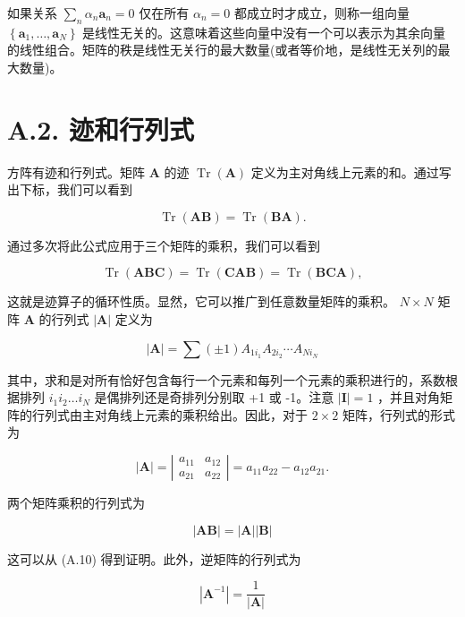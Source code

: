 \documentclass[10pt]{article}
\begin{document}
如果关系 \(\mathop{\sum }\limits_{n}{\alpha }_{n}{\mathbf{a}}_{n} = 0\) 仅在所有 \({\alpha }_{n} = 0\) 都成立时才成立，则称一组向量 \(\left\{  {{\mathbf{a}}_{1},\ldots ,{\mathbf{a}}_{N}}\right\}\) 是线性无关的。这意味着这些向量中没有一个可以表示为其余向量的线性组合。矩阵的秩是线性无关行的最大数量(或者等价地，是线性无关列的最大数量)。

\section*{A.2. 迹和行列式}

方阵有迹和行列式。矩阵 \(\mathbf{A}\) 的迹 \(\operatorname{Tr}\left( \mathbf{A}\right)\) 定义为主对角线上元素的和。通过写出下标，我们可以看到

\[
\operatorname{Tr}\left( \mathbf{{AB}}\right)  = \operatorname{Tr}\left( \mathbf{{BA}}\right) . \tag{A.8}
\]

通过多次将此公式应用于三个矩阵的乘积，我们可以看到

\[
\operatorname{Tr}\left( \mathbf{{ABC}}\right)  = \operatorname{Tr}\left( \mathbf{{CAB}}\right)  = \operatorname{Tr}\left( \mathbf{{BCA}}\right) , \tag{A.9}
\]

这就是迹算子的循环性质。显然，它可以推广到任意数量矩阵的乘积。 \(N \times  N\) 矩阵 \(\mathbf{A}\) 的行列式 \(\left| \mathbf{A}\right|\) 定义为

\[
\left| \mathbf{A}\right|  = \sum \left( {\pm 1}\right) {A}_{1{i}_{1}}{A}_{2{i}_{2}}\cdots {A}_{N{i}_{N}} \tag{A.10}
\]

其中，求和是对所有恰好包含每行一个元素和每列一个元素的乘积进行的，系数根据排列 \({i}_{1}{i}_{2}\ldots {i}_{N}\) 是偶排列还是奇排列分别取 +1 或 -1。注意 \(\left| \mathbf{I}\right|  = 1\) ，并且对角矩阵的行列式由主对角线上元素的乘积给出。因此，对于 \(2 \times  2\) 矩阵，行列式的形式为

\[
\left| \mathbf{A}\right|  = \left| \begin{array}{ll} {a}_{11} & {a}_{12} \\  {a}_{21} & {a}_{22} \end{array}\right|  = {a}_{11}{a}_{22} - {a}_{12}{a}_{21}. \tag{A.11}
\]

两个矩阵乘积的行列式为

\[
\left| \mathbf{{AB}}\right|  = \left| \mathbf{A}\right| \left| \mathbf{B}\right|  \tag{A.12}
\]

这可以从 (A.10) 得到证明。此外，逆矩阵的行列式为

\[
\left| {\mathbf{A}}^{-1}\right|  = \frac{1}{\left| \mathbf{A}\right| } \tag{A.13}
\]
\end{document}
